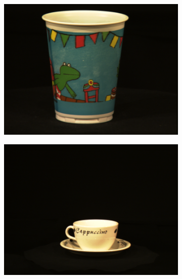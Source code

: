 \begin{figure}[tbp]
\begin{subfigure}{80pt}
    \caption{}
	\end{subfigure}
	\begin{subfigure}{80pt}
        \centering
    \includegraphics[width=\textwidth]{figures/aloi_original/514.png}
    \caption{}
	\end{subfigure}
	\begin{subfigure}{80pt}
        \centering
    \includegraphics[width=\textwidth]{figures/aloi_original/774.png}
    \caption{}
	\end{subfigure}
	\begin{subfigure}{80pt}
        \centering

\end{subfigure}
\end{figure}
